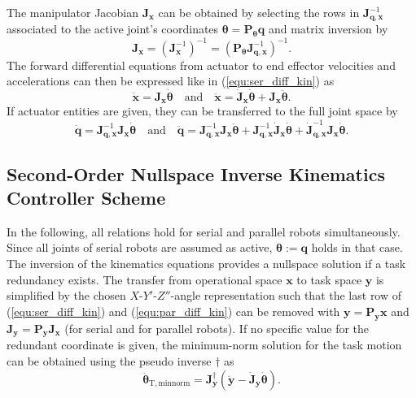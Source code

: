 \documentclass[runningheads]{llncs}
\newcommand{\bm}[1]{\boldsymbol{#1}}
\begin{document}
The manipulator Jacobian $\bm{J}_{\bm{x}}$ can be obtained by selecting the rows in $\bm{J}_{\bm{q},\bm{x}}^{-1}$ associated to the active joint's coordinates $\bm{\theta}=\bm{P}_{\bm{\theta}} \bm{q}$ and matrix inversion by
%
%
\begin{equation}
\bm{J}_{\bm{x}} 
= \left(\bm{J}_{\bm{x}}^{-1}\right)^{-1}
= \left(\bm{P}_{\bm{\theta}} \bm{J}_{\bm{q},\bm{x}}^{-1}\right)^{-1}.
\label{equ:par_jacobi_inv}
\end{equation}
%
The forward differential equations from actuator to end effector velocities and accelerations can then be expressed like in (\ref{equ:ser_diff_kin}) as
\begin{equation}
\dot{\bm{x}}=\bm{J}_{\bm{x}} \dot{\bm{\theta}}
\quad\mathrm{and}\quad
\ddot{\bm{x}}=\dot{\bm{J}}_{\bm{x}} \dot{\bm{\theta}} + \bm{J}_{\bm{x}} \ddot{\bm{\theta}}.
\label{equ:par_diff_kin}
\end{equation}
%
If actuator entities are given, they can be transferred to the full joint space by
\begin{equation}
\dot{\bm{q}}=
\bm{J}_{\bm{q},\bm{x}}^{-1}
\bm{J}_{\bm{x}} \dot{\bm{\theta}}
\quad \mathrm{and} \quad
\ddot{\bm{q}}=
\bm{J}_{\bm{q},\bm{x}}^{-1}
\bm{J}_{\bm{x}} \ddot{\bm{\theta}}
+
\bm{J}_{\bm{q},\bm{x}}^{-1}
\dot{\bm{J}}_{\bm{x}} \dot{\bm{\theta}}
+
\dot{\bm{J}}_{\bm{q},\bm{x}}^{-1}
\bm{J}_{\bm{x}} \dot{\bm{\theta}}
.
\label{equ:par_nullspace_acttofull}
\end{equation}


\subsection{Second-Order Nullspace Inverse Kinematics Controller Scheme}


In the following, all relations hold for serial and parallel robots simultaneously.
Since all joints of serial robots are assumed as active, $\bm{\theta}:=\bm{q}$ holds in that case.
The inversion of the kinematics equations provides a nullspace solution if a task redundancy exists.
The transfer from operational space $\bm{x}$ to task space $\bm{y}$ is simplified by the chosen $X$-$Y'$-$Z''$-angle representation such that the last row of (\ref{equ:ser_diff_kin}) and (\ref{equ:par_diff_kin}) can be removed with $\bm{y}=\bm{P}_{\bm{y}} \bm{x}$ and $\bm{J}_{\bm{y}} = \bm{P}_{\bm{y}} \bm{J}_{\bm{x}}$ (for serial and for parallel robots).
If no specific value for the redundant coordinate is given, the minimum-norm solution for the task motion can be obtained using the pseudo inverse $\dagger$ as
%
\begin{equation}
\ddot{\bm{\theta}}_{\mathrm{T,minnorm}}
= \bm{J}_{\bm{y}}^{\dagger}(\ddot{\bm{y}} - \dot{\bm{J}}_{\bm{y}} \dot{\bm{\theta}}).%
\label{equ:ik_task_minnorm}
\end{equation}
\end{document}

